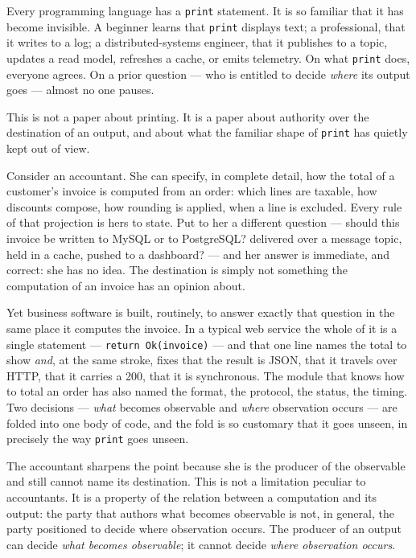 \documentclass[
]{article}
\begin{document}
Every programming language has a \texttt{print} statement. It is so
familiar that it has become invisible. A beginner learns that
\texttt{print} displays text; a professional, that it writes to a log; a
distributed-systems engineer, that it publishes to a topic, updates a
read model, refreshes a cache, or emits telemetry. On what
\texttt{print} does, everyone agrees. On a prior question --- who is
entitled to decide \emph{where} its output goes --- almost no one
pauses.

This is not a paper about printing. It is a paper about authority over
the destination of an output, and about what the familiar shape of
\texttt{print} has quietly kept out of view.

Consider an accountant. She can specify, in complete detail, how the
total of a customer's invoice is computed from an order: which lines are
taxable, how discounts compose, how rounding is applied, when a line is
excluded. Every rule of that projection is hers to state. Put to her a
different question --- should this invoice be written to MySQL or to
PostgreSQL? delivered over a message topic, held in a cache, pushed to a
dashboard? --- and her answer is immediate, and correct: she has no
idea. The destination is simply not something the computation of an
invoice has an opinion about.

Yet business software is built, routinely, to answer exactly that
question in the same place it computes the invoice. In a typical web
service the whole of it is a single statement ---
\texttt{return\ Ok(invoice)} --- and that one line names the total to
show \emph{and}, at the same stroke, fixes that the result is JSON, that
it travels over HTTP, that it carries a 200, that it is synchronous. The
module that knows how to total an order has also named the format, the
protocol, the status, the timing. Two decisions --- \emph{what} becomes
observable and \emph{where} observation occurs --- are folded into one
body of code, and the fold is so customary that it goes unseen, in
precisely the way \texttt{print} goes unseen.

The accountant sharpens the point because she is the producer of the
observable and still cannot name its destination. This is not a
limitation peculiar to accountants. It is a property of the relation
between a computation and its output: the party that authors what
becomes observable is not, in general, the party positioned to decide
where observation occurs. The producer of an output can decide
\emph{what becomes observable}; it cannot decide \emph{where observation
occurs}.
\end{document}
